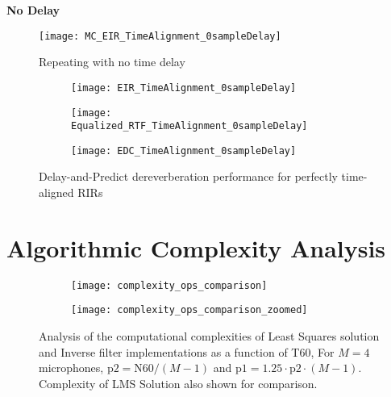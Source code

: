 \textbf{No Delay}

\begin{figure}[H]
	\texttt{[image: MC\_EIR\_TimeAlignment\_0sampleDelay]}
	\centering
	\caption{Repeating with no time delay}
	\label{fig:params_MC_EIR_TimeAlignment_0sampleDelay}
\end{figure}

\begin{figure}[H]
	\centering
	\begin{subfigure}[b]{0.32\textwidth}
		\centering
		\texttt{[image: EIR\_TimeAlignment\_0sampleDelay]}
	\end{subfigure}
	\hfill
	\begin{subfigure}[b]{0.32\textwidth}
		\centering
		\texttt{[image: Equalized\_RTF\_TimeAlignment\_0sampleDelay]}
	\end{subfigure}
	\hfill
	\begin{subfigure}[b]{0.32\textwidth}
		\centering
		\texttt{[image: EDC\_TimeAlignment\_0sampleDelay]}
	\end{subfigure}
	\hfill
	\caption{Delay-and-Predict dereverberation performance for perfectly time-aligned RIRs}
	\label{fig:params_TimeAlignment_0sampleDelay}
\end{figure}

\section{Algorithmic Complexity Analysis}

\begin{figure}[H]
	\centering
	\begin{subfigure}[b]{0.45\textwidth}
		\centering
		\texttt{[image: complexity\_ops\_comparison]}
	\end{subfigure}
	\hfill
	\begin{subfigure}[b]{0.45\textwidth}
		\centering
		\texttt{[image: complexity\_ops\_comparison\_zoomed]}
	\end{subfigure}
	\caption{Analysis of the computational complexities of Least Squares solution and Inverse filter implementations as a function of T60, For $M=4$ microphones, $\mathrm{p2} = \mathrm{N60}/(M-1)$ and $\mathrm{p1} = 1.25 \cdot \mathrm{p2} \cdot (M-1)$. Complexity of LMS Solution also shown for comparison.}
	\label{fig:complexity_operations}
\end{figure}

